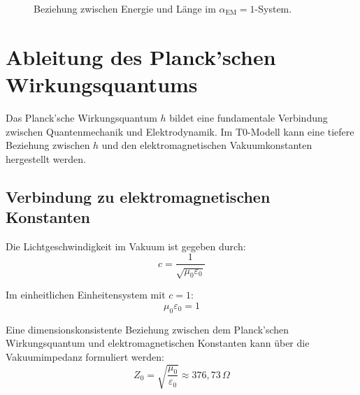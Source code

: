 \documentclass[12pt,a4paper]{article}
\newcommand{\alphaEM}{\alpha_{\text{EM}}}
\begin{document}
	\begin{figure}[h]
		\centering
		\caption{Beziehung zwischen Energie und Länge im \(\alphaEM = 1\)-System.}
		\label{fig:energy_length}
	\end{figure}
	
	\section{Ableitung des Planck'schen Wirkungsquantums}
	\label{sec:planck_quantum}
	
	Das Planck'sche Wirkungsquantum \(h\) bildet eine fundamentale Verbindung zwischen Quantenmechanik und Elektrodynamik. Im T0-Modell kann eine tiefere Beziehung zwischen \(h\) und den elektromagnetischen Vakuumkonstanten hergestellt werden.
	
	\subsection{Verbindung zu elektromagnetischen Konstanten}
	\label{subsec:electromagnetic_constants}
	
	Die Lichtgeschwindigkeit im Vakuum ist gegeben durch:
	\begin{equation}
		\label{eq:speed_of_light}
		c = \frac{1}{\sqrt{\mu_0 \varepsilon_0}}
	\end{equation}
	
	Im einheitlichen Einheitensystem mit \(c = 1\):
	\begin{equation}
		\label{eq:mu_epsilon}
		\mu_0 \varepsilon_0 = 1
	\end{equation}
	
	Eine dimensionskonsistente Beziehung zwischen dem Planck'schen Wirkungsquantum und elektromagnetischen Konstanten kann über die Vakuumimpedanz formuliert werden:
	\begin{equation}
		\label{eq:vacuum_impedance}
		Z_0 = \sqrt{\frac{\mu_0}{\varepsilon_0}} \approx 376,73 \, \Omega
	\end{equation}
	
\end{document}
